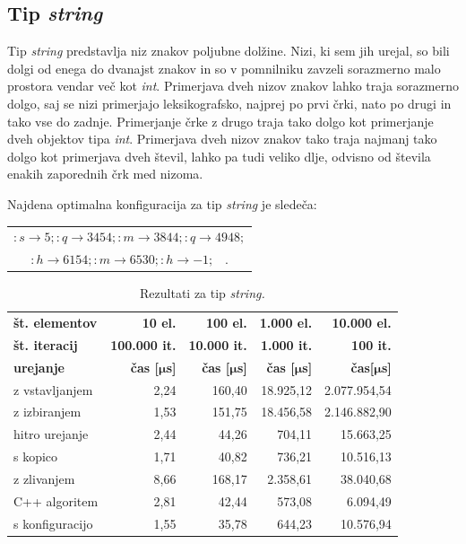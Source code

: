 \documentclass[a4paper,oneside,12pt]{article}
\newcommand{\lra}{\ensuremath{\longrightarrow}}
\newcommand{\edot}{\;\;\;.}
\newcommand{\bmu}{\ensuremath{\boldsymbol{\mu}}}
\newcommand{\usec}{\ensuremath{\bmu}s}
\begin{document}
\pagebreak
\mbox{}

\pagebreak
\subsection{Tip \emph{string}}
\label{chapter:rez:string}
Tip \emph{string} predstavlja niz znakov poljubne dolžine. Nizi, ki sem jih urejal, so
bili dolgi od enega do dvanajst znakov in so v pomnilniku zavzeli sorazmerno malo prostora
vendar več kot \emph{int}. Primerjava dveh nizov znakov lahko traja sorazmerno dolgo, saj se
nizi primerjajo leksikografsko, najprej po prvi črki, nato po drugi in tako vse do zadnje.
Primerjanje črke z drugo traja tako dolgo kot primerjanje dveh objektov tipa \emph{int}.
Primerjava dveh nizov znakov tako traja najmanj tako dolgo kot primerjava dveh števil, lahko
pa tudi veliko dlje, odvisno od števila enakih zaporednih črk med nizoma.

Najdena optimalna konfiguracija za tip \emph{string} je sledeča:
\vspace{-0.3ex}
\begin{center}
  \begin{tabular}[h!]{c} 
    $ :s \lra 5;:q \lra 3454;:m \lra 3844;:q \lra 4948; $ \\
    $ :h \lra 6154;:m \lra 6530;:h \lra -1; \edot $ \\
  \end{tabular}
\end{center}

\vspace{-1.0ex}
\begin{table}[h!]
  \centering
  \caption[Rezultati za tip \emph{string}]{Rezultati za tip \emph{string.}}
  \label{tab:rez:string} \vspace{1ex}
  \begin{tabular}{l!{\vrule width 1pt}r|r|r|r}
    \bf št. elementov     & \bf 10 el.& \bf 100 el.& \bf 1.000 el. & \bf 10.000 el. \\ 
    \bf št. iteracij      & \bf 100.000 it. & \bf 10.000 it. & \bf 1.000 it. & \bf 100 it. \\ \hline
    \bf urejanje          & \bf čas [\usec] & \bf čas [\usec] & \bf čas [\usec] & \bf čas[\usec] \\  
    z vstavljanjem        & 2,24 & 160,40 & 18.925,12 & 2.077.954,54 \\ \hline
    z izbiranjem          & 1,53 & 151,75 & 18.456,58 & 2.146.882,90 \\ \hline
    hitro urejanje        & 2,44 &  44,26 &    704,11 &    15.663,25 \\ \hline
    s kopico              & 1,71 &  40,82 &    736,21 &    10.516,13 \\ \hline
    z zlivanjem           & 8,66 & 168,17 &  2.358,61 &    38.040,68 \\ \hline
    C++ algoritem         & 2,81 &  42,44 &    573,08 &     6.094,49 \\ \hline
    s konfiguracijo       & 1,55 &  35,78 &    644,23 &    10.576,94 \\ 
  \end{tabular}
\end{table}
\end{document}
